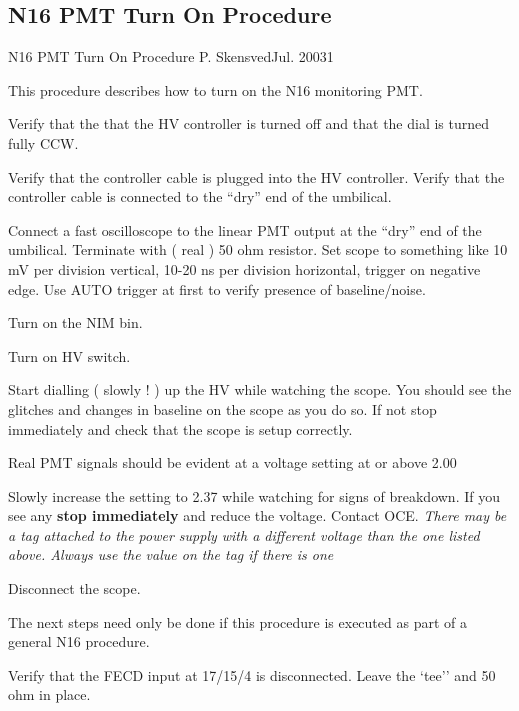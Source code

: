 \newpage


\subsection{N16 PMT Turn On Procedure}

             {N16 PMT Turn On Procedure}
        {P. Skensved}{Jul. 2003}{1}



 This procedure describes how to turn on the N16 monitoring PMT.

\begin{enumerate}

\checkitem Verify that the that the HV controller is turned off and that the dial is turned fully CCW.

\checkitem Verify that the controller cable is plugged into the HV controller.
\checkitem Verify that the controller cable is connected to the ``dry'' end of the umbilical.

\checkitem Connect a fast oscilloscope to the linear PMT output at the ``dry'' end
of the umbilical. Terminate with ( real ) 50 ohm resistor. 
\checkitem Set scope to something like 
10 mV per division vertical, 10-20 ns per division horizontal, trigger on negative edge. Use
AUTO trigger at first to verify presence of baseline/noise.

\checkitem Turn on the NIM bin.

\checkitem Turn on HV switch.

\checkitem Start dialling ( slowly ! ) up the HV while watching the scope. You should see the glitches and changes in
baseline on the scope as you do so. If not stop immediately and check that the scope is setup correctly.

\checkitem Real PMT signals should be evident at a voltage setting at or above 2.00

\checkitem Slowly increase the setting to 2.37 while watching for signs of breakdown. If you see any 
{\bf stop immediately}  and reduce the voltage. Contact OCE.
\small
{\em There may be a tag attached to the power supply with a different voltage than the one 
listed above. Always use the value on the tag if there is one}
\normalsize 


\checkitem Disconnect the scope.


  The next steps need only be done if this procedure is executed as part of a general N16 procedure.

\checkitem Verify that the FECD input at 17/15/4 is disconnected. Leave the `tee'' and 50 ohm in place.



\end{enumerate}
